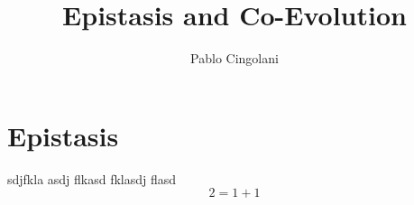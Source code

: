 \documentclass[10pt,a4paper]{article}
\author{Pablo Cingolani}
\title{Epistasis and Co-Evolution}
\begin{document}
\section{Epistasis}

sdjfkla asdj flkasd fklasdj flasd
\[
 2 = 1 + 1
\]
\end{document}
